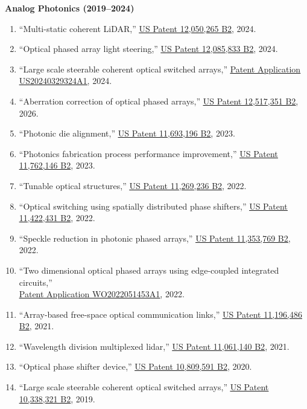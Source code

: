 \noindent\textbf{Analog Photonics (2019--2024)}
\begin{enumerate}
    \item ``Multi-static coherent LiDAR,'' \href{https://patents.google.com/patent/US12050265B2}{\underline{US Patent 12,050,265 B2}}, 2024.
    \item ``Optical phased array light steering,'' \href{https://patents.google.com/patent/US12085833B2}{\underline{US Patent 12,085,833 B2}}, 2024.
    \item ``Large scale steerable coherent optical switched arrays,'' \href{https://patents.google.com/patent/US20240329324A1}{\underline{Patent Application US20240329324A1}}, 2024.
    \item ``Aberration correction of optical phased arrays,'' \href{https://patents.google.com/patent/US12517351B2}{\underline{US Patent 12,517,351 B2}}, 2026.
    \item ``Photonic die alignment,'' \href{https://patents.google.com/patent/US11693196B2}{\underline{US Patent 11,693,196 B2}}, 2023.
    \item ``Photonics fabrication process performance improvement,'' \href{https://patents.google.com/patent/US11762146B2}{\underline{US Patent 11,762,146 B2}}, 2023.
    \item ``Tunable optical structures,'' \href{https://patents.google.com/patent/US11269236B2}{\underline{US Patent 11,269,236 B2}}, 2022.
    \item ``Optical switching using spatially distributed phase shifters,'' \href{https://patents.google.com/patent/US11422431B2}{\underline{US Patent 11,422,431 B2}}, 2022.
    \item ``Speckle reduction in photonic phased arrays,'' \href{https://patents.google.com/patent/US11353769B2}{\underline{US Patent 11,353,769 B2}}, 2022.
    \item ``Two dimensional optical phased arrays using edge-coupled integrated circuits,'' \\
    \href{https://patents.google.com/patent/WO2022051453A1}{\underline{Patent Application WO2022051453A1}}, 2022.
    \item ``Array-based free-space optical communication links,'' \href{https://patents.google.com/patent/US11196486B2}{\underline{US Patent 11,196,486 B2}}, 2021.
    \item ``Wavelength division multiplexed lidar,'' \href{https://patents.google.com/patent/US11061140B2}{\underline{US Patent 11,061,140 B2}}, 2021.
    \item ``Optical phase shifter device,'' \href{https://patents.google.com/patent/US10809591B2}{\underline{US Patent 10,809,591 B2}}, 2020.
    \item ``Large scale steerable coherent optical switched arrays,'' \href{https://patents.google.com/patent/US10338321B2}{\underline{US Patent 10,338,321 B2}}, 2019.
\end{enumerate}


